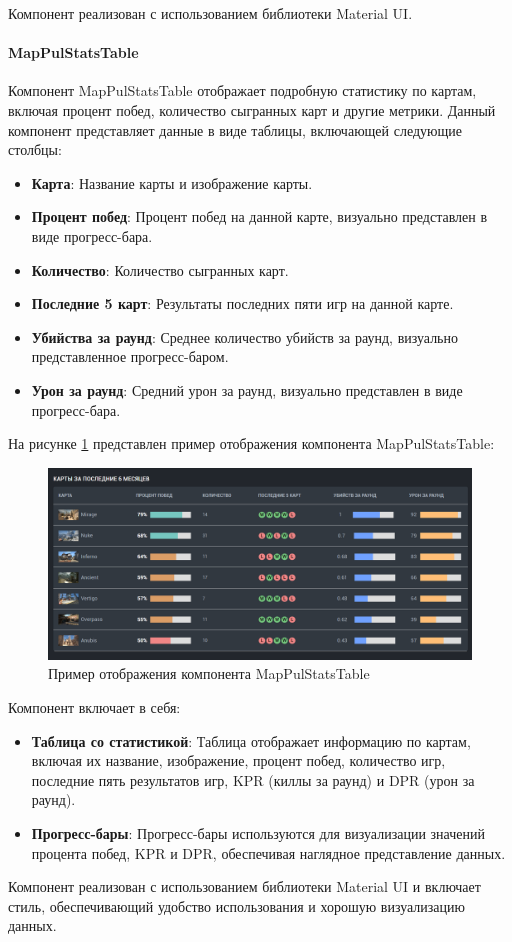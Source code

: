 Компонент реализован с использованием библиотеки Material UI.

\paragraph{MapPulStatsTable}

Компонент MapPulStatsTable отображает подробную статистику по картам, включая процент побед, количество сыгранных карт и другие метрики. Данный компонент представляет данные в виде таблицы, включающей следующие столбцы:

\begin{itemize}
	\item \textbf{Карта}: Название карты и изображение карты.
	\item \textbf{Процент побед}: Процент побед на данной карте, визуально представлен в виде прогресс-бара.
	\item \textbf{Количество}: Количество сыгранных карт.
	\item \textbf{Последние 5 карт}: Результаты последних пяти игр на данной карте.
	\item \textbf{Убийства за раунд}: Среднее количество убийств за раунд, визуально представленное прогресс-баром.
	\item \textbf{Урон за раунд}: Средний урон за раунд, визуально представлен в виде прогресс-бара.
\end{itemize}

На рисунке \ref{fig:MapPulStatsTable} представлен пример отображения компонента MapPulStatsTable:
\begin{figure}
	\centering
	\includegraphics[width=0.95\linewidth]{images/MapPulStatsTable}
	\caption{Пример отображения компонента MapPulStatsTable}
	\label{fig:MapPulStatsTable}
\end{figure}

Компонент включает в себя:
\begin{itemize}
	\item \textbf{Таблица со статистикой}: Таблица отображает информацию по картам, включая их название, изображение, процент побед, количество игр, последние пять результатов игр, KPR (киллы за раунд) и DPR (урон за раунд).
	\item \textbf{Прогресс-бары}: Прогресс-бары используются для визуализации значений процента побед, KPR и DPR, обеспечивая наглядное представление данных.
\end{itemize}

Компонент реализован с использованием библиотеки Material UI и включает стиль, обеспечивающий удобство использования и хорошую визуализацию данных.